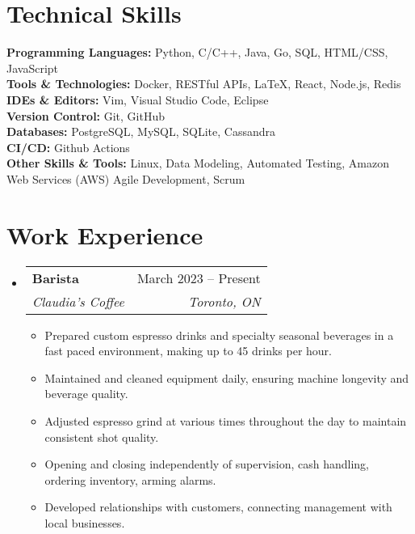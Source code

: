 \documentclass[letterpaper,11pt]{article}
\makeatletter
\newcommand{\resumeItem}[1]{
  \item\small{
    {#1 \vspace{-2pt}}
  }
}
\newcommand{\resumeSubheading}[4]{
  \vspace{-2pt}\item
    \begin{tabular*}{0.97\textwidth}[t]{l@{\extracolsep{\fill}}r}
      \textbf{#1} & #2 \\
      \textit{\small#3} & \textit{\small #4} \\
    \end{tabular*}\vspace{-7pt}
}
\newcommand{\resumeSubHeadingListStart}{\begin{itemize}[leftmargin=0.15in, label={}]}
\newcommand{\resumeSubHeadingListEnd}{\end{itemize}}
\newcommand{\resumeItemListStart}{\begin{itemize}}
\newcommand{\resumeItemListEnd}{\end{itemize}\vspace{-5pt}}
\makeatother
\begin{document}
\section{Technical Skills}
 \begin{itemize}[leftmargin=0.15in, label={}]
    \small{\item{
	\textbf{Programming Languages:} Python, C/C++, Java, Go, SQL, HTML/CSS, JavaScript \\
	\textbf{Tools \& Technologies:} Docker, RESTful APIs, LaTeX, React, Node.js, Redis \\
	\textbf{IDEs \& Editors:} Vim, Visual Studio Code, Eclipse \\
	\textbf{Version Control:} Git, GitHub \\
	\textbf{Databases:} PostgreSQL, MySQL, SQLite, Cassandra \\
	\textbf{CI/CD:} Github Actions \\
	\textbf{Other Skills \& Tools:} Linux, Data Modeling, Automated Testing, Amazon Web Services (AWS) Agile Development, Scrum
    }}
 \end{itemize}


\section{Work Experience}
  \resumeSubHeadingListStart

    \resumeSubheading
      {Barista}{March 2023 -- Present}
      {Claudia's Coffee}{Toronto, ON}
      \resumeItemListStart
        \resumeItem{Prepared custom espresso drinks and specialty seasonal beverages in a fast paced environment, making up to 45 drinks per hour.}
	\resumeItem{Maintained and cleaned equipment daily, ensuring machine longevity and beverage quality.}
	\resumeItem{Adjusted espresso grind at various times throughout the day to maintain consistent shot quality.}
	\resumeItem{Opening and closing independently of supervision, cash handling, ordering inventory, arming alarms.}
	\resumeItem{Developed relationships with customers, connecting management with local businesses.}
      \resumeItemListEnd

  \resumeSubHeadingListEnd


\end{document}
